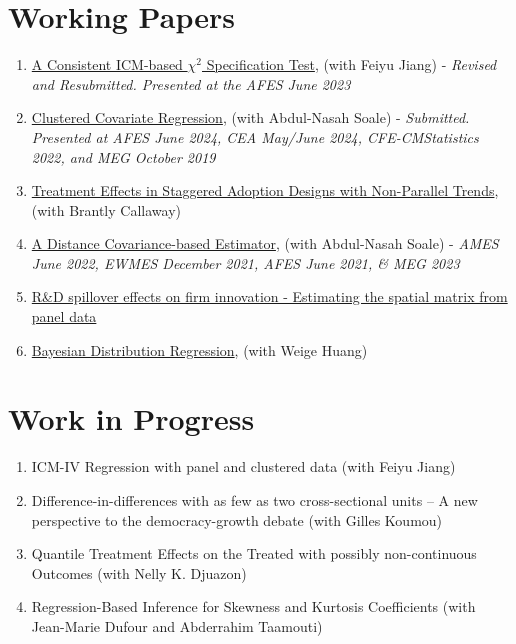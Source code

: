 \documentclass[12pt,letterpaper]{article}
\begin{document}
\section*{Working Papers}
\begin{enumerate}
  \item \href{https://arxiv.org/pdf/2208.13370.pdf}{A Consistent ICM-based $\chi^2$ Specification Test}, (with Feiyu Jiang) - \textit{Revised and Resubmitted. Presented at the AFES June 2023}
  
  \item \href{https://arxiv.org/pdf/2302.09255.pdf}{Clustered Covariate Regression}, (with Abdul-Nasah Soale) - \textit{Submitted. Presented at AFES June 2024, CEA May/June 2024, CFE-CMStatistics 2022, and MEG October 2019}
  
  \item \href{https://arxiv.org/pdf/2308.02899.pdf}{Treatment Effects in Staggered Adoption Designs with Non-Parallel Trends}, (with Brantly Callaway)

	\item \href{https://arxiv.org/pdf/2102.07008.pdf}{A Distance Covariance-based Estimator}, (with Abdul-Nasah Soale) - \textit{AMES June 2022, EWMES December 2021, AFES June 2021, \&  MEG 2023}
	
		\item  \href{https://estsyawo.github.io/Tsyawo_JMP.pdf#}{R\&D spillover effects on firm innovation - Estimating the spatial matrix from panel data}
	
	\item \href{https://papers.ssrn.com/sol3/papers.cfm?abstract_id=3048658}{Bayesian Distribution Regression}, (with Weige Huang)
\end{enumerate}


\section*{Work in Progress}
\begin{enumerate}
	\item ICM-IV Regression with panel and clustered data (with Feiyu Jiang)

  \item Difference-in-differences with as few as two cross-sectional units
– A new perspective to the democracy-growth debate (with Gilles Koumou)

\item Quantile Treatment Effects on the Treated with possibly non-continuous Outcomes (with Nelly K. Djuazon)

\item Regression-Based Inference for Skewness and Kurtosis Coefficients (with Jean-Marie Dufour and Abderrahim Taamouti)

\end{enumerate}
\end{document}
